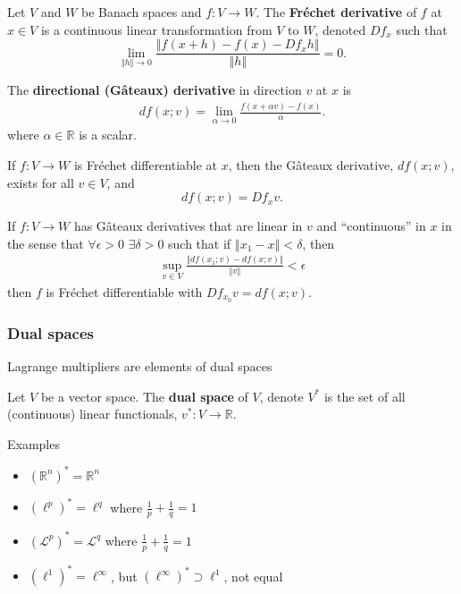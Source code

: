 \documentclass[compress]{beamer}
\def\R{\mathbb{R}}
\newcommand{\norm}[1]{\left\Vert {#1} \right\Vert}
\renewcommand{\to}{{\rightarrow}}
\renewcommand{\L}{{\mathcal{L}}}
\begin{document}
\begin{frame}
  \begin{definition}
    Let $V$ and $W$ be Banach spaces and $f:V \to W$. The
    \textbf{Fr\'{e}chet derivative} of $f$ at $x \in V$ is a continuous linear
    transformation from $V$ to $W$, denoted $Df_x$ such that 
    \[ \lim_{\norm{h} \to 0} \frac{\norm{f(x+h) - f(x) - Df_x h
      }}{\norm{h}} = 0. \]
  \end{definition}
  
  \begin{definition}
    The \textbf{directional (G\^{a}teaux) derivative} in direction $v$
    at $x$ is
    \begin{align*}
      df(x;v) = \lim_{\alpha \to 0} \frac{f(x + \alpha v) - f(x)}{\alpha}.
    \end{align*}  
    where $\alpha \in \R$ is a scalar.
  \end{definition}

\end{frame}

\begin{frame}
  \begin{lemma}\label{lem:fregat}
    If $f: V \to W$ is Fr\'{e}chet differentiable at $x$, then the
    G\^{a}teaux derivative, $df(x;v)$, exists for all $v \in V$, and
    \[ df(x;v) = Df_x v. \]
  \end{lemma}

  \begin{lemma}\label{lem:gatfre}
    If $f: V \to W$ has G\^{a}teaux derivatives that are linear in $v$
    and ``continuous'' in $x$ in the sense that $\forall \epsilon>0$
    $\exists \delta > 0$ such that if $\norm{x_1 - x} < \delta$, then
    \begin{align*}
      \sup_{v \in V} \frac{\norm{df(x_1;v) - df(x;v)}}{\norm{v}} < \epsilon
    \end{align*}
    then $f$ is Fr\'{e}chet differentiable with $Df_{x_0} v = df(x;v)$.
  \end{lemma}
\end{frame}

\begin{frame}\frametitle{Dual spaces}
  Lagrange multipliers are elements of dual spaces
  \begin{definition}
    Let $V$ be a vector space. The \textbf{dual space} of $V$, denote $V^\ast$
    is the set of all (continuous) linear functionals, $v^\ast: V \to \R$.
  \end{definition}
  Examples
  \begin{itemize}
  \item $(\R^n)^\ast = \R^n$
  \item $(\ell^p)^\ast = \ell^q$ where $\frac{1}{p} + \frac{1}{q} = 1$
  \item $(\L^p)^\ast = \L^q$ where $\frac{1}{p} + \frac{1}{q} = 1$
  \item $(\ell^1)^\ast = \ell^\infty$, but $(\ell^\infty)^\ast \supset
    \ell^1$, not equal
  \end{itemize}
\end{frame}
\end{document}

